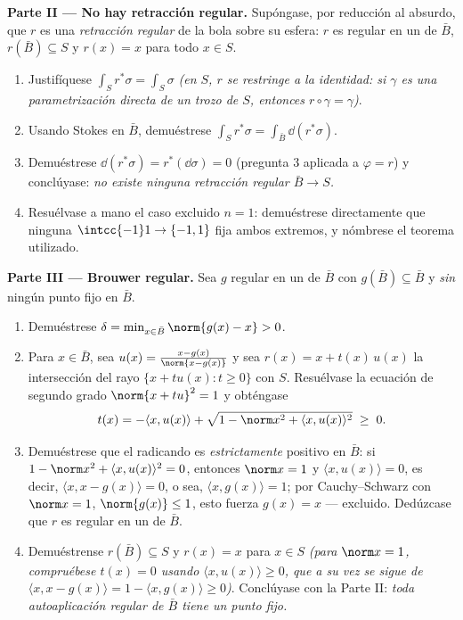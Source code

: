 \begin{problem}
\medskip
\noindent\textbf{Parte II --- No hay retracción regular.} Supóngase, por
reducción al absurdo, que $r$ es una \emph{retracción regular} de la
bola sobre su esfera: $r$ es regular en un
 de $\bar B$,
$r(\bar B) \subseteq S$ y $r(x) = x$ para todo
$x \in S$.
\begin{enumerate}[resume]
  \item Justifíquese $\int_Sr^*\sigma = \int_S\sigma$ \emph{(en $S$, $r$
  se restringe a la identidad: si $\gamma$ es una parametrización
  directa de un trozo de $S$, entonces $r\circ\gamma = \gamma$)}. \item
  Usando Stokes en $\bar B$, demuéstrese $\int_Sr^*\sigma =
        \int_{\bar B}\dd(r^*\sigma)$. \item Demuéstrese
  $\dd(r^*\sigma) = r^*(\dd\sigma) = 0$ (pregunta 3 aplicada a
  $\varphi = r$) y conclúyase: \emph{no existe ninguna retracción
  regular $\bar B \to S$.} \item Resuélvase a mano el caso excluido
  $n = 1$: demuéstrese directamente que ninguna
  $\intcc{-1}1 \to
        \{-1, 1\}$ fija ambos extremos, y nómbrese el teorema utilizado.
\end{enumerate}

\medskip
\noindent\textbf{Parte III --- Brouwer regular.} Sea $g$ regular en un
 de $\bar B$ con $g(\bar B)
\subseteq \bar B$ y \emph{sin} ningún punto fijo en $\bar B$.
\begin{enumerate}[resume]
  \item Demuéstrese $\delta = \min_{x\in\bar B}\norm{g(x) - x} >
        0$. \item Para $x \in \bar B$, sea $u(x) = \frac{x -
        g(x)}{\norm{x - g(x)}}$ y sea $r(x) = x +
        t(x)\,u(x)$ la intersección del rayo $\{x + tu(x) : t \geq 0\}$
  con $S$. Resuélvase la ecuación de segundo grado $\norm{x + tu}^2 = 1$
  y obténgase
        \[
        t(x) = -\langle x, u(x)\rangle +
        \sqrt{1 - \norm x^2 + \langle x, u(x)\rangle^2}
        \;\geq\; 0 .
        \]
  \item Demuéstrese que el radicando es \emph{estrictamente} positivo en
  $\bar B$: si $1 - \norm x^2 + \langle x,
        u(x)\rangle^2 = 0$, entonces $\norm x = 1$ y $\langle
        x, u(x)\rangle = 0$, es decir, $\langle x, x -
        g(x)\rangle = 0$, o sea, $\langle x, g(x)\rangle =
        1$; por Cauchy--Schwarz con $\norm x = 1$, $\norm{g(x)} \leq 1$,
  esto fuerza $g(x) = x$ --- excluido. Dedúzcase que $r$ es regular en
  un  de $\bar B$. \item
  Demuéstrense $r(\bar B) \subseteq S$ y $r(x) = x$ para $x
        \in S$ \emph{(para $\norm x = 1$, compruébese $t(x) = 0$ usando
  $\langle x, u(x)\rangle \geq 0$, que a su vez se sigue de
  $\langle x, x - g(x)\rangle = 1 -
        \langle x, g(x)\rangle \geq 0$)}. Conclúyase con la Parte II:
  \emph{toda autoaplicación regular de $\bar B$ tiene un punto fijo.}
\end{enumerate}


\end{problem}
